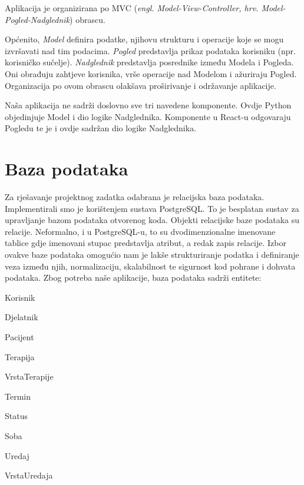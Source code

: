 Aplikacija je organizirana po MVC (\textit{engl. Model-View-Controller, hrv. Model-Pogled-Nadglednik}) obrascu.  

Općenito, \textit{Model} definira podatke, njihovu strukturu i operacije koje se mogu izvršavati nad tim podacima. \textit{Pogled} predstavlja prikaz podataka korisniku (npr. korisničko sučelje).
\textit{Nadglednik} predstavlja posrednike između Modela i Pogleda. Oni obrađuju zahtjeve korisnika, vrše operacije nad Modelom i ažuriraju Pogled. Organizacija po ovom obrascu olakšava proširivanje i održavanje aplikacije.

Naša aplikacija ne sadrži doslovno sve tri navedene komponente. Ovdje Python objedinjuje Model i dio logike Nadglednika. Komponente u React-u odgovaraju Pogledu te je i ovdje sadržan dio logike Nadglednika.

				
		\section{Baza podataka}

Za rješavanje projektnog zadatka odabrana je relacijska baza podataka. Implementirali smo je korištenjem sustava PostgreSQL. To je besplatan sustav za upravljanje bazom podataka otvorenog koda. Objekti relacijske baze podataka su relacije. Neformalno, i u PostgreSQL-u, to su dvodimenzionalne imenovane tablice gdje imenovani stupac predstavlja atribut, a redak zapis relacije. Izbor ovakve baze podataka omogućio nam je lakše strukturiranje podatka i definiranje veza između njih, normalizaciju, skalabilnost te sigurnost kod pohrane i dohvata podataka. 
Zbog potreba naše aplikacije, baza podataka sadrži entitete:

        \begin{packed_item}
		\item 	\textnormal{Korisnik}
		\item 	\textnormal{Djelatnik}
        \item 	\textnormal{Pacijent}
        \item 	\textnormal{Terapija}
        \item 	\textnormal{VrstaTerapije}	
        \item 	\textnormal{Termin}			
        \item 	\textnormal{Status}		
        \item 	\textnormal{Soba}	
        \item 	\textnormal{Uredaj}
        \item 	\textnormal{VrstaUredaja}
                   				
	 \end{packed_item}

